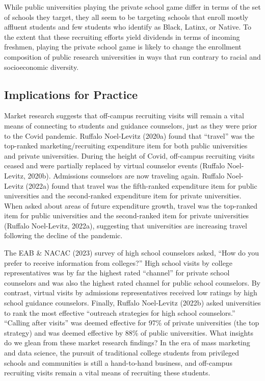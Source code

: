 \documentclass[
  12pt,
]{article}
\begin{document}
While public universities playing the private school game differ in terms of the set of schools they target, they all seem to be targeting schools that enroll mostly affluent students and few students who identify as Black, Latinx, or Native. To the extent that these recruiting efforts yield dividends in terms of incoming freshmen, playing the private school game is likely to change the enrollment composition of public research universities in ways that run contrary to racial and socioeconomic diversity.

\subsection{Implications for Practice}\label{implications-for-practice}

Market research suggests that off-campus recruiting visits will remain a vital means of connecting to students and guidance counselors, just as they were prior to the Covid pandemic. Ruffalo Noel-Levitz (2020a) found that ``travel'' was the top-ranked marketing/recruiting expenditure item for both public universities and private universities. During the height of Covid, off-campus recruiting visits ceased and were partially replaced by virtual counselor events (Ruffalo Noel-Levitz, 2020b). Admissions counselors are now traveling again. Ruffalo Noel-Levitz (2022a) found that travel was the fifth-ranked expenditure item for public universities and the second-ranked expenditure item for private universities. When asked about areas of future expenditure growth, travel was the top-ranked item for public universities and the second-ranked item for private universities (Ruffalo Noel-Levitz, 2022a), suggesting that universities are increasing travel following the decline of the pandemic.

The EAB \& NACAC (2023) survey of high school counselors asked, ``How do you prefer to receive information from colleges?'' High school visits by college representatives was by far the highest rated ``channel'' for private school counselors and was also the highest rated channel for public school counselors. By contrast, virtual visits by admissions representatives received low ratings by high school guidance counselors. Finally, Ruffalo Noel-Levitz (2022b) asked universities to rank the most effective ``outreach strategies for high school counselors.'' ``Calling after visits'' was deemed effective for 97\% of private universities (the top strategy) and was deemed effective by 88\% of public universities. What insights do we glean from these market research findings? In the era of mass marketing and data science, the pursuit of traditional college students from privileged schools and communities is still a hand-to-hand business, and off-campus recruiting visits remain a vital means of recruiting these students.
\end{document}
